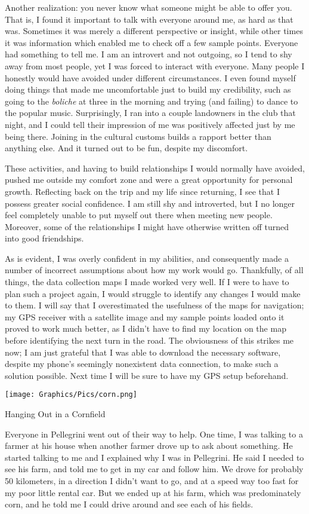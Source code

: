 Another realization: you never know what someone might be able to offer you. That is, I found it important to talk with everyone around me, as hard as that was. Sometimes it was merely a different perspective or insight, while other times it was information which enabled me to check off a few sample points. Everyone had something to tell me. I am an introvert and not outgoing, so I tend to shy away from most people, yet I was forced to interact with everyone. Many people I honestly would have avoided under different circumstances. I even found myself doing things that made me uncomfortable just to build my credibility, such as going to the \textit{boliche} at three in the morning and trying (and failing) to dance to the popular music. Surprisingly, I ran into a couple landowners in the club that night, and I could tell their impression of me was positively affected just by me being there. Joining in the cultural customs builds a rapport better than anything else. And it turned out to be fun, despite my discomfort.

These activities, and having to build relationships I would normally have avoided, pushed me outside my comfort zone and were a great opportunity for personal growth. Reflecting back on the trip and my life since returning, I see that I possess greater social confidence. I am still shy and introverted, but I no longer feel completely unable to put myself out there when meeting new people. Moreover, some of the relationships I might have otherwise written off turned into good friendships.

As is evident, I was overly confident in my abilities, and consequently made a number of incorrect assumptions about how my work would go. Thankfully, of all things, the data collection maps I made worked very well. If I were to have to plan such a project again, I would struggle to identify any changes I would make to them. I will say that I overestimated the usefulness of the maps for navigation; my GPS receiver with a satellite image and my sample points loaded onto it proved to work much better, as I didn't have to find my location on the map before identifying the next turn in the road. The obviousness of this strikes me now; I am just grateful that I was able to download the necessary software, despite my phone’s seemingly nonexistent data connection, to make such a solution possible. Next time I will be sure to have my GPS setup beforehand.

\begin{ssfigure}
  \centering
  \texttt{[image: Graphics/Pics/corn.png]}
  \caption{Hanging Out in a Cornfield}
  \label{pic:corn}
  \medskip
  \small
  Everyone in Pellegrini went out of their way to help. One time, I was talking to a farmer at his house when another farmer drove up to ask about something. He started talking to me and I explained why I was in Pellegrini. He said I needed to see his farm, and told me to get in my car and follow him. We drove for probably 50 kilometers, in a direction I didn't want to go, and at a speed way too fast for my poor little rental car. But we ended up at his farm, which was predominately corn, and he told me I could drive around and see each of his fields.
\end{ssfigure}

